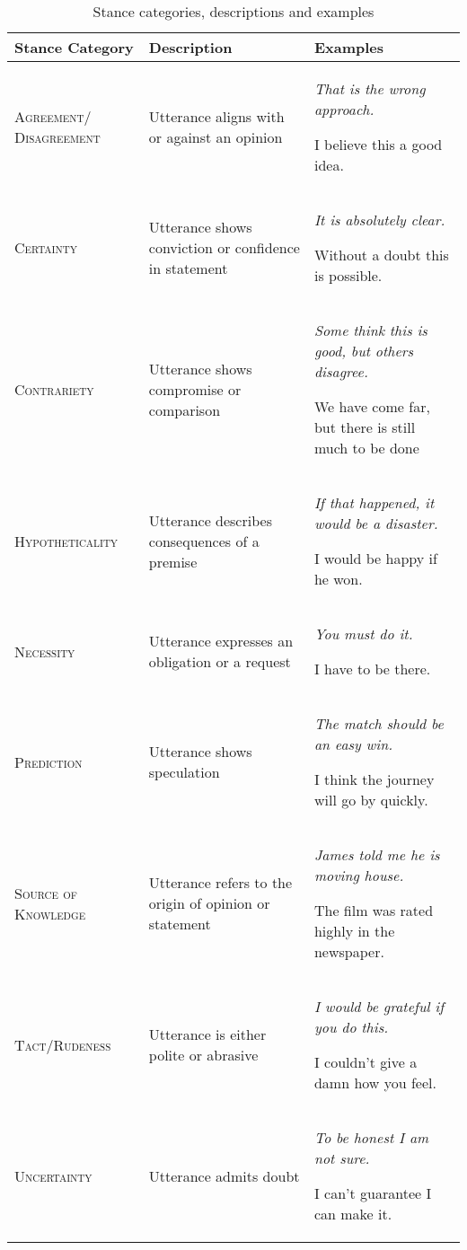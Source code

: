 \documentclass[Dissertation.tex]{subfiles}
\begin{document}
{\renewcommand{\arraystretch}{2.5}
	\centering
	\begin{table}[]
		
		\begin{tabularx}{\textwidth}{>{\raggedright}p{3cm} >{\raggedright}p{5.5cm} X}
			\toprule
			Stance Category        & Description                                            & Examples                                                                                                                                      \\ \midrule
			\small\scshape Agreement/ Disagreement &Utterance aligns with or against an opinion &\itshape That is the wrong approach. \par I believe this a good idea.\\
			\small\scshape Certainty              &Utterance shows conviction or confidence in statement& \itshape It is absolutely clear. \par Without a doubt this is possible.                                          \\
			\small\scshape Contrariety            & Utterance shows compromise or comparison               & \itshape Some think this is good, but others disagree.\par We have come far,  but there is still much to be done\\ 
			\small\scshape Hypotheticality        & Utterance describes consequences of a premise          &\itshape If that happened, it would be a disaster.\par I would be happy if he won.                              \\
			\small\scshape Necessity              & Utterance expresses an obligation or a request         & \itshape You must do it.\par I have to be there.                                                                \\
			\small\scshape Prediction             & Utterance shows speculation                            &\itshape The match should be an easy win.\par I think the journey will go by quickly.                           \\
			\small\scshape Source of Knowledge    & Utterance refers to the origin of opinion or statement & \itshape James told me he is moving house.\par The film was rated highly in the newspaper.                      \\
			\small\scshape Tact/Rudeness          & Utterance is either  polite or abrasive           & \itshape I would be grateful if you do this.\par I couldn’t give a damn how you feel.                           \\
			\small\scshape Uncertainty            & Utterance admits doubt                                 & \itshape To be honest I am not sure.\par I can’t guarantee I can make it.                                       \\ \bottomrule
		\end{tabularx}
		\caption{Stance categories, descriptions and examples}
		\label{tab:stanceExamples}
\end{table}}
\end{document}
